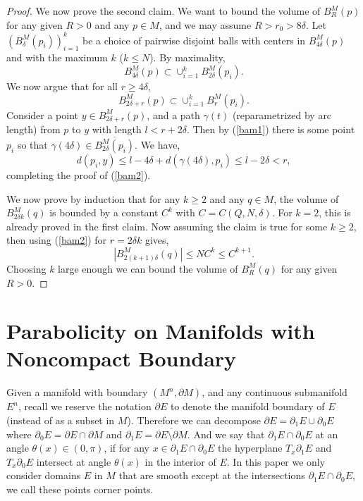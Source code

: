 \documentclass[12pt]{amsart}
\newcommand{\p}{\partial}
\numberwithin{equation}{section}
\begin{document}
\begin{proof}
		
       
		We now prove the second claim.
		We want to bound the volume of $B^M_R(p)$ for any given $R>0$ and any $p\in M$, and we may assume $R>r_0>8\delta$. Let $(B^M_{\delta}(p_i))_{i=1}^k$ be a choice of pairwise disjoint balls with centers in $B^M_{4\delta}(p)$ and with the maximum $k$ ($k \leq N$). By maximality, 
		\begin{equation}\label{bam1}
			B^M_{4\delta}(p)\subset \cup_{i=1}^k B^M_{2\delta}(p_i).
		\end{equation}
		We now argue that for all $r \geq 4\delta$, 
		\begin{equation}\label{bam2}
			B^M_{2\delta+r}(p)\subset \cup_{i=1}^k B^M_{r}(p_i).
		\end{equation}
		Consider a point $y \in B^M_{2\delta+r}(p)$, and a path $\gamma(t)$ (reparametrized by arc length) from $p$ to $y$ with length $l<r+2\delta$. Then by (\ref{bam1}) there is some point $p_i$ so that $\gamma(4\delta) \in \overline{B^M_{2\delta}(p_i)}$. We have,
		\begin{equation*}
			d(p_i,y) \leq l-4\delta+d(\gamma(4\delta),p_i) \leq l- 2\delta<r,
		\end{equation*}
		completing the proof of (\ref{bam2}).

		We now prove by induction that for any $k\geq 2$ and any $q \in M$, the volume of $B^M_{2\delta k}(q)$ is bounded by a constant $C^k$ with $C=C(Q,N,\delta)$. For $k=2$, this is already proved in the first claim. Now assuming the claim is true for some $k \geq 2$, then using (\ref{bam2}) for $r=2\delta k$ gives,
		\begin{equation*}
			|B^M_{2(k+1)\delta}(q)|\leq N C^k \leq C^{k+1}.
		\end{equation*} 
		Choosing $k$ large enough we can bound the volume of $B^M_R(q)$ for any given $R>0$. 
    \end{proof}


	\section{Parabolicity on Manifolds with Noncompact Boundary} \label{pnp}

	Given a manifold with boundary $(M^n,\p M)$, and any continuous submanifold $E^n$, recall we reserve the notation $\p E$ to denote the manifold boundary of $E$ (instead of as a subset in $M$). Therefore we can decompose $\p E =\p_1E \cup \p_0 E$ where $\p_0 E=\p E\cap \p M$ and $\p_1 E =\overline{\p E \setminus \p M}$. And we say that $\p_1 E \cap \p_0 E$ at an angle $\theta(x) \in (0,\pi)$, if for any $x \in \p_1 E \cap \p_0 E$ 
	the hyperplane $T_x \p_1 E$ and $T_x \p_0 E$ intersect at angle $\theta(x)$ in the interior of $E$. 
	In this paper we only consider domains $E$ in $M$ that are smooth except at the intersections $\p_1 E \cap \p_0 E$, we call these points corner points.
\end{document}
